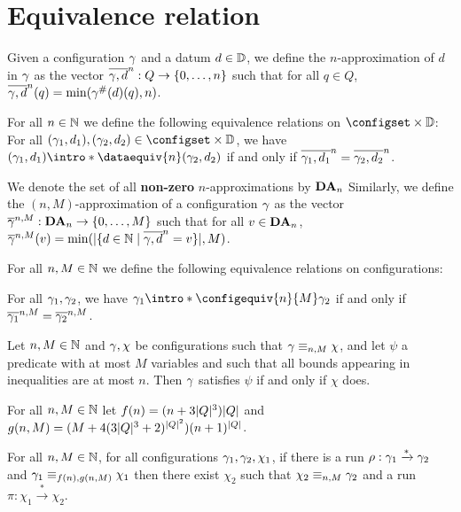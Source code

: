 \section{Equivalence relation}
\label{sec:equivalence-relation}

Given a configuration $\config$ and a datum $d \in \Dataset$, we define the $n$-approximation of $d$ in $\config$ as the vector $\dataapprox{n}{\config}{d} : Q \to \nset{0}{n}$ such that for all $q\in Q$, $\dataapprox{n}{\config}{d}(q)=\min(\counting{\config}(d)(q),n)$.

For all $n \in \nats$ we define the following equivalence relations on $\configset \times \Dataset$: 
For all $(\config_1, d_1), (\config_2, d_2) \in \configset\times \Dataset$, we have $(\config_1, d_1) \intro*\dataequiv{n} (\config_2, d_2)$ if and only if $\dataapprox{n}{\config_1}{d_1} = \dataapprox{n}{\config_2}{d_2}$.



We denote the set of all \textbf{non-zero} $n$-approximations by $\DataApproxSet{n}$
Similarly, we define the $(n,M)$-approximation of a configuration $\config$ as the vector $\configapprox{n}{M}{\config} : \DataApproxSet{n} \to \nset{0}{M}$ such that for all $v\in \DataApproxSet{n}$,
$\configapprox{n}{M}{\config}(v) = \min(\size{\set{d \in \nats \mid \dataapprox{n}{\config}{d} = v}},M)$.

For all $n, M \in \nats$ we define the following equivalence relations on configurations: 

For all $\config_1, \config_2$, we have $\config_1 \intro*\configequiv{n}{M} \config_2$ if and only if $\configapprox{n}{M}{\config_1} = \configapprox{n}{M}{\config_2}$.

\begin{lemma}
	Let $n,M \in \nats$ and $\config, \chi$ be configurations such that $\config \equiv_{n,M} \chi$, and let $\psi$ a predicate with at most $M$ variables and such that all bounds appearing in inequalities are at most $n$.
	Then $\config$ satisfies $\psi$ if and only if $\chi$ does.  
\end{lemma}


For all $n, M \in \nats$ let $f(n) = (n+3\size{Q}^3)\size{Q}$ and $g(n,M) = (M+4(3\size{Q}^3+2)^{\size{Q}^2})(n+1)^{\size{Q}}$.

\begin{lemma}
	For all $n, M \in \nats$, for all configurations $\config_1, \config_2, \chi_1$, if there is a run $\run : \config_1 \xrightarrow{*} \config_2$ and $\config_1 \equiv_{f(n),g(n,M)} \chi_1$ then there exist $\chi_2$ such that $\chi_2 \equiv_{n,M} \config_2$ and a run $\pi : \chi_1 \xrightarrow{*} \chi_2$.
\end{lemma}

